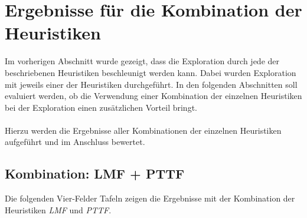 \section{Ergebnisse für die Kombination der Heuristiken}\label{sec_evalKombis}
Im vorherigen Abschnitt wurde gezeigt, dass die Exploration durch jede der beschriebenen Heuristiken beschleunigt werden kann. Dabei wurden Exploration mit jeweils einer der Heuristiken durchgeführt. In den folgenden Abschnitten soll evaluiert werden, ob die Verwendung einer Kombination der einzelnen Heuristiken bei der Exploration einen zusätzlichen Vorteil bringt.
\\\\
Hierzu werden die Ergebnisse aller Kombinationen der einzelnen Heuristiken aufgeführt und im Anschluss bewertet.
\subsection{Kombination: LMF + PTTF}\label{sec_evalLMFPTTF}
Die folgenden Vier-Felder Tafeln zeigen die Ergebnisse mit der Kombination der Heuristiken \emph{LMF} und \emph{PTTF}.
\begin{multicols}{3}
\columnbreak
{}\columnbreak
{}
\end{multicols}

\begin{multicols}{2}
\columnbreak
{}
\end{multicols}

\begin{multicols}{2}
\columnbreak
{}
\end{multicols}

\begin{multicols}{2}
\columnbreak
{}
\end{multicols}

